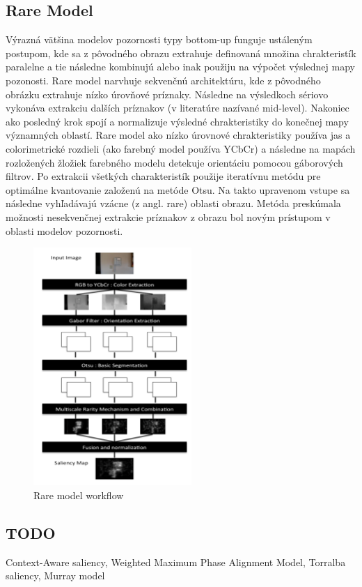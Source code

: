 \subsection{Rare Model}
Výrazná vätšina modelov pozornosti typy bottom-up funguje ustáleným postupom, kde sa z pôvodného obrazu extrahuje definovaná množina chrakteristík paralelne a tie následne kombinujú alebo inak použiju na výpočet výslednej mapy pozonosti. Rare model narvhuje sekvenčnú architektúru, kde z pôvodného obrázku extrahuje nízko úrovňové príznaky. Následne na výsledkoch sériovo vykonáva extrakciu dalších príznakov (v literatúre nazívané mid-level). Nakoniec ako posledný krok spojí a normalizuje výsledné chrakteristiky do konečnej mapy významných oblastí. Rare model ako nízko úrovnové chrakteristiky používa jas a colorimetrické rozdieli (ako farebný model používa YCbCr) a následne na mapách rozložených žložiek farebného modelu detekuje orientáciu pomocou gáborových filtrov\cite{rare-1}. Po extrakcii všetkých charakteristík použije iteratívnu metódu pre optimálne kvantovanie založenú na metóde Otsu\cite{rare-2}. Na takto upravenom vstupe sa následne vyhľadávajú vzácne (z angl. rare) oblasti obrazu. Metóda preskúmala možnosti nesekvenčnej extrakcie príznakov z obrazu bol novým prístupom v oblasti modelov pozornosti.

\begin{figure}[H]
  \centering
  \includegraphics[width=6cm]{pics/rare-1.png}
  \caption{Rare model workflow}\label{wrap-fig:3}
\end{figure}

\subsection{TODO}
Context-Aware saliency, Weighted Maximum Phase Alignment Model, Torralba saliency, Murray model
